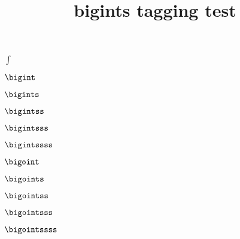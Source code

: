 \documentclass{article}
\title{bigints tagging test}
\begin{document}
$\int$\par
$\bigint$\par
$\bigints$\par
$\bigintss$\par
$\bigintsss$\par
$\bigintssss$\par
$\bigoint$\par
$\bigoints$\par
$\bigointss$\par
$\bigointsss$\par
$\bigointssss$\par
\end{document}
